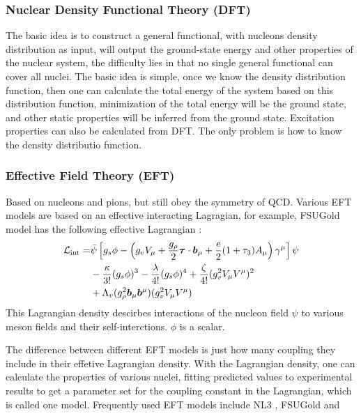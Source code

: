 \subsubsection{Nuclear Density Functional Theory (DFT)}
The basic idea is to construct a general functional, with nucleons density 
distribution as input, will output the ground-state energy and other properties
of the nuclear system, the difficulty lies in that no single general functional
can cover all nuclei.
The basic idea is simple, once we know the density distribution function, then
one can calculate the total energy of the system based on this distribution 
function, minimization of the total energy will be the ground state, and other
static properties will be inferred from the ground state. Excitation properties
can also be calculated from DFT. The only problem is how to know the density
distributio function.


\subsubsection{Effective Field Theory (EFT)}
Based on nucleons and pions, but still obey the symmetry of QCD. 
Various EFT models are based on an effective interacting Lagragian, for example,
FSUGold model has the following effective Lagrangian \cite{PhysRevLett.95.122501}:
\begin{equation}
    \begin{aligned}
	\mathcal{L}_{\text{int}} = &\bar{\psi} \left[ g_s\phi - \left( g_v V_\mu + \frac{g_\rho}{2}\boldsymbol{\tau}\cdot\boldsymbol{b}_\mu + \frac{e}{2}(1 + \tau_3) A_\mu \right)\gamma^\mu \right]\psi \\
	    & - \frac{\kappa}{3!}(g_s\phi)^3 - \frac{\lambda}{4!}(g_s\phi)^4 + \frac{\zeta}{4!}(g_v^2 V_\mu V^\mu )^2	\\
	    & + \Lambda_v(g_\rho^2\boldsymbol{b}_\mu\boldsymbol{b}^\mu)(g_v^2 V_\mu V^\mu)
    \end{aligned}
\end{equation}
This Lagrangian density descirbes interactions of the nucleon field $\psi$ to
various meson fields and their self-interctions. $\phi$ is a scalar.

The difference between different EFT models is just how many coupling they
include in their effetive Lagrangian density. With the Lagrangian density,
one can calculate the properties of various nuclei, fitting predicted values
to experimental results to get a parameter set for the coupling constant in
the Lagrangian, which is called one model. Frequently used EFT models include
NL3 \cite{}, FSUGold \cite{} and 






